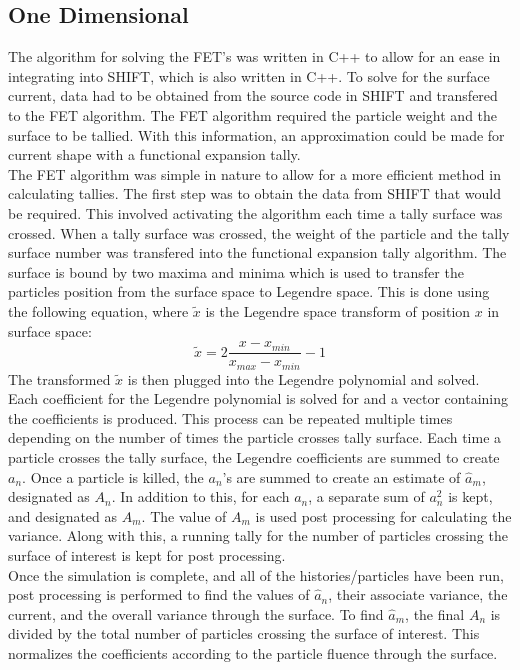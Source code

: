 \documentclass[10tma4paper]{article}
\begin{document}
\subsection{One Dimensional}\label{alg oned}
The algorithm for solving the FET's was written in C++ to allow for an ease in integrating into SHIFT, which is also written in C++. To solve for the surface current, data had to be obtained from the source code in SHIFT and transfered to the FET algorithm. The FET algorithm required the particle weight and the surface to be tallied. With this information, an approximation could be made for current shape with a functional expansion tally.
\\
The FET algorithm was simple in nature to allow for a more efficient method in calculating tallies. The first step was to obtain the data from SHIFT that would be required. This involved activating the algorithm each time a tally surface was crossed. When a tally surface was crossed, the weight of the particle and the tally surface number was transfered into the functional expansion tally algorithm. The surface is bound by two maxima and minima which is used to transfer the particles position from the surface space to Legendre space. This is done using the following equation, where $\tilde{x}$ is the Legendre space transform of position $x$ in surface space:
\begin{equation} \label{eq:legendre transform}
\tilde{x} = 2 \frac{x-x_{min}}{x_{max}-x_{min}} - 1
\end{equation}
The transformed $\tilde{x}$ is then plugged into the Legendre polynomial and solved. Each coefficient for the Legendre polynomial is solved for and a vector containing the coefficients is produced. This process can be repeated multiple times depending on the number of times the particle crosses tally surface. Each time a particle crosses the tally surface, the Legendre coefficients are summed to create $a_{n}$. Once a particle is killed, the $a_{n}$'s are summed to create an estimate of $\hat{a}_{m}$, designated as $A_{n}$. In addition to this, for each $a_{n}$, a separate sum of $a_{n}^{2}$ is kept, and designated as $A_{m}$. The value of $A_{m}$ is used post processing for calculating the variance. Along with this, a running tally for the number of particles crossing the surface of interest is kept for post processing.
\\
Once the simulation is complete, and all of the histories/particles have been run, post processing  is performed to find the values of $\hat{a}_{n}$, their associate variance, the current, and the overall variance through the surface. To find $\hat{a}_{m}$, the final $A_{n}$ is divided by the total number of particles crossing the surface of interest. This normalizes the coefficients according to the particle fluence through the surface. \\
\end{document}
